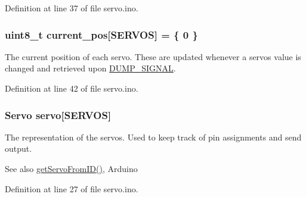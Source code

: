 Definition at line 37 of file servo.\+ino.

\hypertarget{servo_8ino_ae88c6e452cc6a2dc7af59897c42d8e1e}{}
\subsubsection[{current\+\_\+pos}]{\setlength{\rightskip}{0pt plus 5cm}uint8\+\_\+t current\+\_\+pos\mbox{[}{\bf S\+E\+R\+V\+O\+S}\mbox{]} = \{ 0 \}}\label{servo_8ino_ae88c6e452cc6a2dc7af59897c42d8e1e}
The current position of each servo. These are updated whenever a servos value is changed and retrieved upon \hyperlink{servo_8ino_a99fb83031ce9923c84392b4e92f956b5a31cd671c80d04a4acc2d8256ec960c90}{D\+U\+M\+P\+\_\+\+S\+I\+G\+N\+A\+L}. 

Definition at line 42 of file servo.\+ino.

\hypertarget{servo_8ino_adf02be48d17da3f4a229ebfdfda2fa71}{}
\subsubsection[{servo}]{\setlength{\rightskip}{0pt plus 5cm}Servo servo\mbox{[}{\bf S\+E\+R\+V\+O\+S}\mbox{]}}\label{servo_8ino_adf02be48d17da3f4a229ebfdfda2fa71}
The representation of the servos. Used to keep track of pin assignments and send output. \begin{DoxySeeAlso}{See also}
\hyperlink{rhand_8h_a13edec01163cd92d516634c36fe06aeb}{get\+Servo\+From\+I\+D()}, Arduino 
\end{DoxySeeAlso}


Definition at line 27 of file servo.\+ino.

